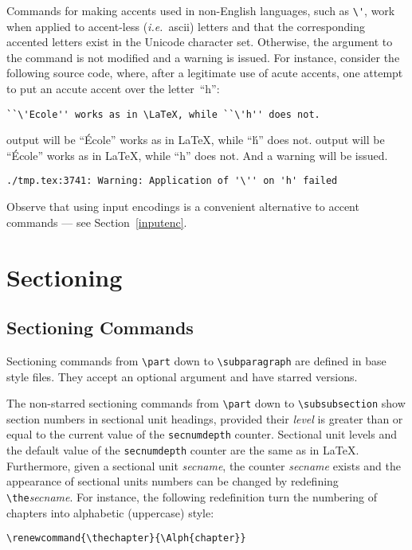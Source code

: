 Commands for making accents used in non-English languages, such as
\verb+\'+, work when applied to accent-less (\emph{i.e.}\ ascii)
letters and that the corresponding accented letters exist
in the Unicode character set.
Otherwise, the argument to the command is not modified
and a warning is issued.
For instance, consider the following source code, where, after a
legitimate use of acute accents, one attempt to put an accute accent
over the letter~``h'':
\begin{verbatim}
``\'Ecole'' works as in \LaTeX, while ``\'h'' does not.
\end{verbatim}
\ifhevea
\hevea{} output will be ``\'Ecole'' works as in \LaTeX, while ``\'h'' does not.
\else
\hevea{} output will  be ``\'Ecole'' works as in \LaTeX, while ``h'' does not.
\fi{}
And a warning will be issued.
\begin{verbatim}
./tmp.tex:3741: Warning: Application of '\'' on 'h' failed
\end{verbatim}


Observe that using input encodings
is a convenient alternative to accent commands ---
see Section~\ref{inputenc}.

\section{Sectioning}

\subsection{\label{section:section}Sectioning Commands}
Sectioning commands from \verb+\part+ down to
\verb+\subparagraph+ are defined in base style files.
They accept an optional argument and have starred versions.


The non-starred sectioning commands from \verb+\part+ down to
\verb+\subsubsection+ show section numbers in sectional unit headings,
provided their \textit{level} is greater than or equal to the current
value of the \verb+secnumdepth+ counter.
Sectional unit levels and the default value of the \verb+secnumdepth+ counter
are the same as in \LaTeX{}.
Furthermore, given a sectional unit {\it secname}, the
counter {\it secname} exists and the appearance of sectional units
numbers can be changed by redefining \verb+\the+{\it secname}.
For instance, the following redefinition turn the numbering of
chapters into alphabetic (uppercase) style:
\begin{verbatim}
\renewcommand{\thechapter}{\Alph{chapter}}
\end{verbatim}

